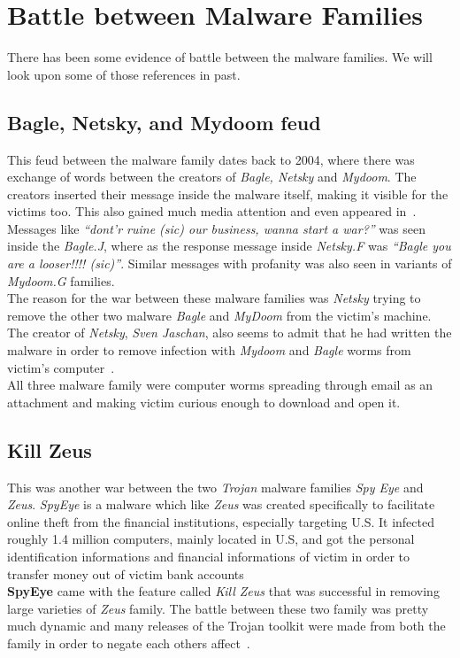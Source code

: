 \section{Battle between Malware Families}
\label{sec:Battle between Malware Families}
There has been some evidence of battle between the malware families. We will look upon some of those references in past.
\subsection{Bagle, Netsky, and Mydoom feud}
\label{sub:Bagle, Netsky, and Mydoom feud}
This feud between the malware family dates back to 2004, where there was exchange of words between the creators of \emph{Bagle, Netsky} and \emph{Mydoom}.
The creators inserted their message inside the malware itself, making it visible for the victims too. This also gained much media attention and even appeared in~\cite[BBC]{bbccover}.
Messages like \emph{``dont'r ruine (sic) our business, wanna start a war?''} was seen inside the \emph{Bagle.J}, where as the response message inside \emph{Netsky.F} was \emph{``Bagle \- you are a looser!!!! (sic)''}.
Similar messages with profanity was also seen in variants of \emph{Mydoom.G} families.\\
The reason for the war between these malware families was \emph{Netsky} trying to remove the other two malware \emph{Bagle} and \emph{MyDoom} from the victim's machine.
The creator of \emph{Netsky}, \emph{Sven Jaschan}, also seems to admit that he had written the malware in order to remove infection with \emph{Mydoom} and \emph{Bagle} worms from victim's computer~\cite[]{wikinetsky}.\\
All three malware family were computer worms spreading through email as an attachment and making victim curious enough to download and open it.
\subsection{Kill Zeus}
\label{sub:Kill Zeus}
This was another war between the two \emph{Trojan} malware families \emph{Spy Eye} and \emph{Zeus}.
\emph{SpyEye} is a malware which like \emph{Zeus} was created specifically to facilitate online theft from the financial institutions, especially targeting U.S.
It infected roughly 1.4 million computers, mainly located in U.S, and got the personal identification informations and financial informations of victim in order to transfer money out of victim bank accounts~\cite[]{fbispyeye} \\
\textbf{SpyEye} came with the feature called \emph{Kill Zeus} that was successful in removing large varieties of \emph{Zeus} family.
The battle between these two family was pretty much dynamic and many releases of the Trojan toolkit were made from both the family in order to negate each others affect~\cite[]{sanszeus}.
